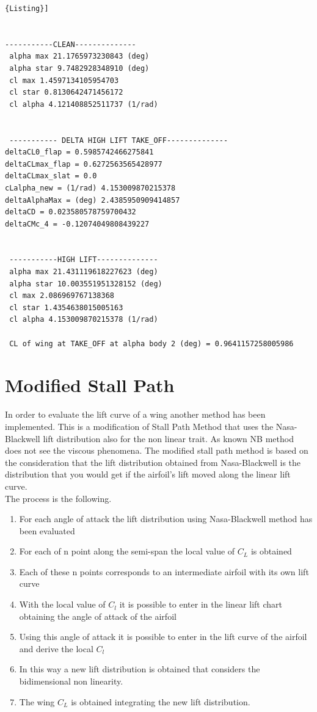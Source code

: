 \begin{lstlisting}[caption={{\footnotesize Wing Lift characteristic results for TAKE-OFF. BOEING 747-100B, M=0.2 }},label= [style=\bfseries]{Listing}]


-----------CLEAN-------------- 
 alpha max 21.1765973230843 (deg)
 alpha star 9.7482928348910 (deg)
 cl max 1.4597134105954703
 cl star 0.8130642471456172
 cl alpha 4.121408852511737 (1/rad)


 ----------- DELTA HIGH LIFT TAKE_OFF-------------- 
deltaCL0_flap = 0.5985742466275841
deltaCLmax_flap = 0.6272563565428977
deltaCLmax_slat = 0.0
cLalpha_new = (1/rad) 4.153009870215378
deltaAlphaMax = (deg) 2.4385950909414857
deltaCD = 0.023580578759700432
deltaCMc_4 = -0.12074049808439227


 -----------HIGH LIFT-------------- 
 alpha max 21.431119618227623 (deg)
 alpha star 10.003551951328152 (deg)
 cl max 2.086969767138368
 cl star 1.4354638015005163
 cl alpha 4.153009870215378 (1/rad)
 
 CL of wing at TAKE_OFF at alpha body 2 (deg) = 0.9641157258005986
\end{lstlisting}

\section{Modified Stall Path}

In order to evaluate the lift curve of a wing another method has been implemented. This is a modification of Stall Path Method that uses the Nasa-Blackwell lift distribution also for the non linear trait. As known NB method does not see the viscous phenomena. The modified stall path method is based on the consideration that the lift distribution obtained from Nasa-Blackwell is the distribution that you would get if the airfoil's lift moved along the linear lift curve.\\
The process is the following.

\begin{enumerate}
	\item For each angle of attack the lift distribution using Nasa-Blackwell method has been evaluated
	\item For each of n point along the semi-span the local value of $C_L$ is obtained 
	\item Each of these n points corresponds to an intermediate airfoil with its own lift curve
	\item With the local value of $C_l$  it is possible to enter in the linear lift chart obtaining the angle of attack of the airfoil
	\item Using this angle of attack it is possible to enter in the lift curve of the airfoil and derive the local $C_l$
	\item In this way a new lift distribution is obtained that considers the bidimensional non linearity.
	\item The wing $C_L$ is obtained integrating the new lift distribution.
\end{enumerate}

